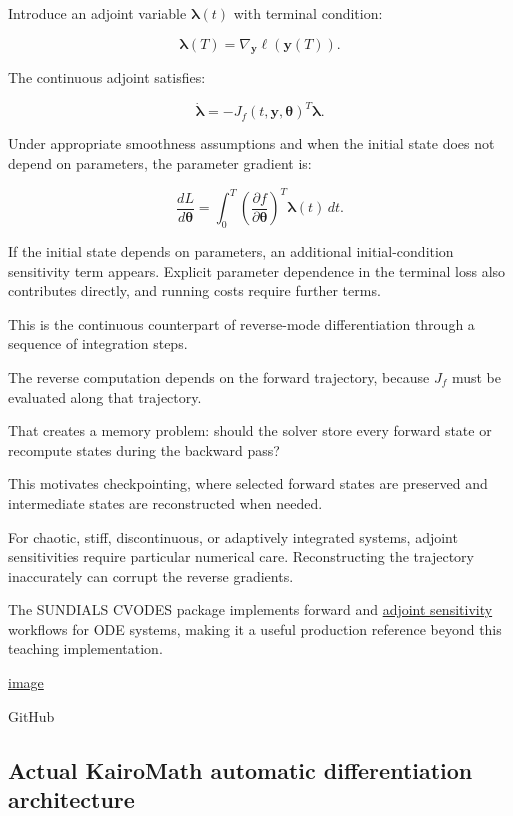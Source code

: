Introduce an adjoint variable \(\boldsymbol\lambda(t)\) with terminal condition:

\[
\boxed{ \boldsymbol\lambda(T)= \nabla_{\mathbf y}\ell(\mathbf y(T)) }.
\]

The continuous adjoint satisfies:

\[
\boxed{ \dot{\boldsymbol\lambda} = -J_f(t,\mathbf y,\boldsymbol\theta)^T \boldsymbol\lambda }.
\]

Under appropriate smoothness assumptions and when the initial state does not depend on parameters, the parameter gradient is:

\[
\boxed{ \frac{dL}{d\boldsymbol\theta} = \int_0^T \left(\frac{\partial f}{\partial\boldsymbol\theta}\right)^T \boldsymbol\lambda(t)\,dt }.
\]

If the initial state depends on parameters, an additional initial-condition sensitivity term appears. Explicit parameter dependence in the terminal loss also contributes directly, and running costs require further terms.

This is the continuous counterpart of reverse-mode differentiation through a sequence of integration steps.

The reverse computation depends on the forward trajectory, because \(J_f\) must be evaluated along that trajectory.

That creates a memory problem: should the solver store every forward state or recompute states during the backward pass?

This motivates checkpointing, where selected forward states are preserved and intermediate states are reconstructed when needed.

For chaotic, stiff, discontinuous, or adaptively integrated systems, adjoint sensitivities require particular numerical care. Reconstructing the trajectory inaccurately can corrupt the reverse gradients.

The SUNDIALS CVODES package implements forward and \hyperref[02-foundations-ii-ch022-numerical-differentiation-and-automatic-differentiation]{adjoint sensitivity} workflows for ODE systems, making it a useful production reference beyond this teaching implementation. 

\href{https://www.google.com/s2/favicons?domain=https://github.com&sz=32}{image}

GitHub

\subsection{Actual KairoMath automatic differentiation architecture}\label{02-foundations-ii-ch022-actual-kairomath-automatic-differentiation-architecture}

